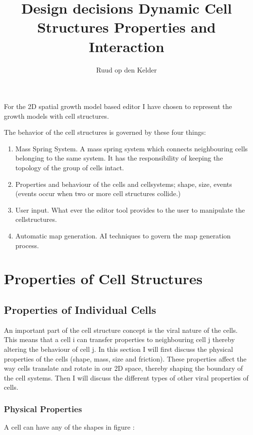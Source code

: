 \documentclass{article}
\title{Design decisions Dynamic Cell Structures \small{Properties and Interaction}}
\author{Ruud op den Kelder}
\begin{document}
\maketitle

For the 2D spatial growth model based editor I have chosen to represent the growth models with cell structures. 

The behavior of the cell structures is governed by these four things:  

\begin{enumerate}
\item Mass Spring System. A mass spring system which connects neighbouring cells belonging to the same system. It has the responsibility of keeping the topology of the group of cells intact.  
\item Properties and behaviour of the cells and cellsystems; shape, size, events (events occur when two or more cell structures collide.) 
\item User input. What ever the editor tool provides to the user to manipulate the cellstructures.
\item Automatic map generation. AI techniques to govern the map generation process.  
\end{enumerate}  

\section{Properties of Cell Structures}

\subsection{Properties of Individual Cells}
 
An important part of the cell structure concept is the viral nature of the cells. This means that a cell i can transfer properties to neighbouring cell j thereby altering the behaviour of cell j. In this section I will first discuss the physical properties of the cells (shape, mass, size and friction). These properties affect the way cells translate and rotate in our 2D space, thereby shaping the boundary of the cell systems. Then I will discuss the different types of other viral properties of cells.    





\subsubsection{Physical Properties}
A cell can have any of the shapes in figure \label{fig: shapes}:
\end{document}
